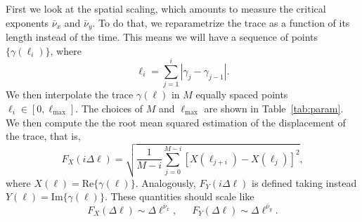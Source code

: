 First we look at the spatial scaling, which amounts to measure the critical
exponents $\bar{\nu}_x$ and $\bar{\nu}_y$. To do that, we reparametrize the
trace as a function of its length instead of the time. This means we will have
a sequence of points $\{\gamma(\ell_i)\}$, where
\begin{equation}
    \ell_i = \sum_{j=1}^i \left|\gamma_j-\gamma_{j-1}\right|.
\end{equation}
We then interpolate the trace $\gamma(\ell)$ in $M$ equally spaced points
$\ell_i\in[0,\ell_{\max}]$. The choices of $M$ and $\ell_{\max}$ are shown in
Table~\ref{tab:param}. We then compute the the root mean squared estimation of
the displacement of the trace, that is,
\begin{equation}
    \label{eq:correl}
    F_X(i\Delta\ell) = \sqrt{\frac{1}{M-i}
    \sum_{j=0}^{M-i}{[X(\ell_{j+i}) - X(\ell_j)]}^2 },
\end{equation}
where $X(\ell) = \mbox{Re}\{\gamma(\ell)\}$.
Analogously, $F_Y(i\Delta\ell)$ is defined taking instead
$Y(\ell)=\mbox{Im}\{\gamma(\ell)\}$. These quantities should scale like
\begin{equation}
    F_{X}\left(\Delta\ell\right)\sim\Delta\ell^{\bar{\nu}_{x}},
    \,\,\,\,\,\,\,\,\,
    F_{Y}\left(\Delta\ell\right)\sim\Delta\ell^{\bar{\nu}_{y}}.
\end{equation}

